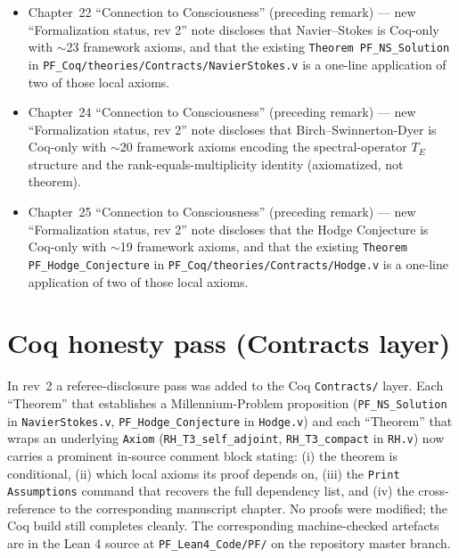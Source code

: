 \begin{itemize}
      ``$\triangle$ CURRENT PROOF CAVEAT'' docstring in the Lean source.
\item Chapter~22 ``Connection to Consciousness'' (preceding remark) ---
      new ``Formalization status, rev 2'' note discloses that
      Navier--Stokes is Coq-only with $\sim$23 framework axioms, and
      that the existing \texttt{Theorem PF\_NS\_Solution} in
      \texttt{PF\_Coq/theories/Contracts/NavierStokes.v} is a
      one-line application of two of those local axioms.
\item Chapter~24 ``Connection to Consciousness'' (preceding remark) ---
      new ``Formalization status, rev 2'' note discloses that
      Birch--Swinnerton-Dyer is Coq-only with $\sim$20 framework
      axioms encoding the spectral-operator $T_E$ structure and the
      rank-equals-multiplicity identity (axiomatized, not theorem).
\item Chapter~25 ``Connection to Consciousness'' (preceding remark) ---
      new ``Formalization status, rev 2'' note discloses that the
      Hodge Conjecture is Coq-only with $\sim$19 framework axioms,
      and that the existing \texttt{Theorem PF\_Hodge\_Conjecture}
      in \texttt{PF\_Coq/theories/Contracts/Hodge.v} is a one-line
      application of two of those local axioms.
\end{itemize}

\section*{Coq honesty pass (Contracts layer)}

In rev~2 a referee-disclosure pass was added to the Coq
\texttt{Contracts/} layer. Each ``Theorem'' that establishes a
Millennium-Problem proposition (\texttt{PF\_NS\_Solution} in
\texttt{NavierStokes.v}, \texttt{PF\_Hodge\_Conjecture} in
\texttt{Hodge.v}) and each ``Theorem'' that wraps an underlying
\texttt{Axiom} (\texttt{RH\_T3\_self\_adjoint},
\texttt{RH\_T3\_compact} in \texttt{RH.v}) now carries a prominent
in-source comment block stating: (i) the theorem is conditional, (ii)
which local axioms its proof depends on, (iii) the
\texttt{Print Assumptions} command that recovers the full dependency
list, and (iv) the cross-reference to the corresponding manuscript
chapter. No proofs were modified; the Coq build still completes
cleanly.
The corresponding machine-checked artefacts are in the Lean 4 source at
\texttt{PF\_Lean4\_Code/PF/} on the repository master branch.


